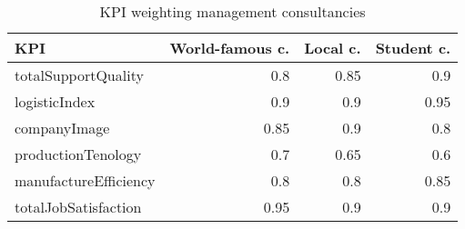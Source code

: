 \begin{table}[ht]
\centering
\begin{tabular}{|l|r|r|r|}
\hline
KPI                     & World-famous c.   & Local c.   & Student c.\\ \hline
totalSupportQuality     & 0.8               & 0.85       & 0.9       \\
logisticIndex           & 0.9               & 0.9        & 0.95      \\
companyImage            & 0.85              & 0.9        & 0.8       \\
productionTenology      & 0.7               & 0.65       & 0.6       \\
manufactureEfficiency   & 0.8               & 0.8        & 0.85      \\
totalJobSatisfaction    & 0.95              & 0.9        & 0.9       \\
\hline
\end{tabular}
\caption{KPI weighting management consultancies}
\label{mngc_weighting}
\end{table}

